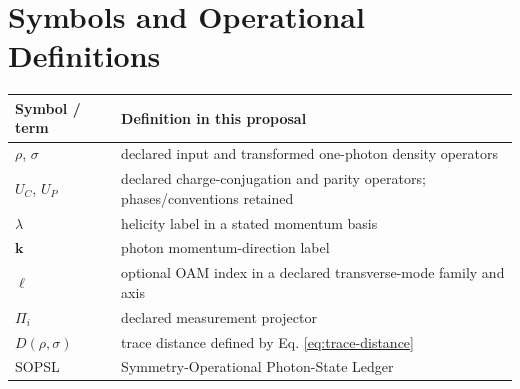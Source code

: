 \documentclass[conference]{../../../../Conference-LaTeX-template_10-17-19/IEEEtran}
\begin{document}
\section{Symbols and Operational Definitions}
\begin{tabularx}{0.96\columnwidth}{lY}
\toprule
Symbol / term & Definition in this proposal \\
\midrule
$\rho$, $\sigma$ & declared input and transformed one-photon density operators \\
$U_C$, $U_P$ & declared charge-conjugation and parity operators; phases/conventions retained \\
$\lambda$ & helicity label in a stated momentum basis \\
$\mathbf{k}$ & photon momentum-direction label \\
$\ell$ & optional OAM index in a declared transverse-mode family and axis \\
$\Pi_i$ & declared measurement projector \\
$D(\rho,\sigma)$ & trace distance defined by Eq. \eqref{eq:trace-distance} \\
SOPSL & Symmetry-Operational Photon-State Ledger \\
\bottomrule
\end{tabularx}
\end{document}
